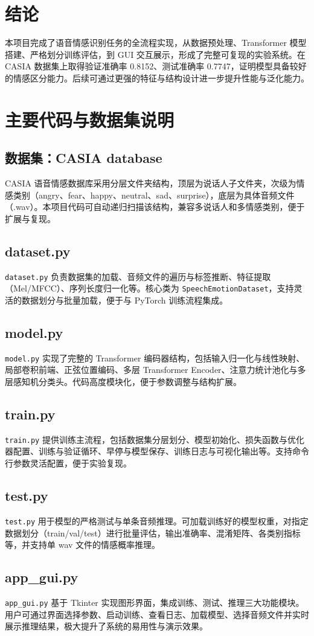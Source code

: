 \documentclass[UTF8, a4paper，12pt]{ctexart}
\begin{document}
\section{结论}
本项目完成了语音情感识别任务的全流程实现，从数据预处理、Transformer 模型搭建、严格划分训练评估，到 GUI 交互展示，形成了完整可复现的实验系统。在 CASIA 数据集上取得验证准确率 0.8152、测试准确率 0.7747，证明模型具备较好的情感区分能力。后续可通过更强的特征与结构设计进一步提升性能与泛化能力。


\section{主要代码与数据集说明}
\subsection{数据集：CASIA database}
CASIA 语音情感数据库采用分层文件夹结构，顶层为说话人子文件夹，次级为情感类别（angry、fear、happy、neutral、sad、surprise），底层为具体音频文件（.wav）。本项目代码可自动递归扫描该结构，兼容多说话人和多情感类别，便于扩展与复现。

\subsection{dataset.py}
\texttt{dataset.py} 负责数据集的加载、音频文件的遍历与标签推断、特征提取（Mel/MFCC）、序列长度归一化等。核心类为 \texttt{SpeechEmotionDataset}，支持灵活的数据划分与批量加载，便于与 PyTorch 训练流程集成。

\subsection{model.py}
\texttt{model.py} 实现了完整的 Transformer 编码器结构，包括输入归一化与线性映射、局部卷积前端、正弦位置编码、多层 Transformer Encoder、注意力统计池化与多层感知机分类头。代码高度模块化，便于参数调整与结构扩展。

\subsection{train.py}
\texttt{train.py} 提供训练主流程，包括数据集分层划分、模型初始化、损失函数与优化器配置、训练与验证循环、早停与模型保存、训练日志与可视化输出等。支持命令行参数灵活配置，便于实验复现。

\subsection{test.py}
\texttt{test.py} 用于模型的严格测试与单条音频推理。可加载训练好的模型权重，对指定数据划分（train/val/test）进行批量评估，输出准确率、混淆矩阵、各类别指标等，并支持单 wav 文件的情感概率推理。

\subsection{app\_gui.py}
\texttt{app\_gui.py} 基于 Tkinter 实现图形界面，集成训练、测试、推理三大功能模块。用户可通过界面选择参数、启动训练、查看日志、加载模型、选择音频文件并实时展示推理结果，极大提升了系统的易用性与演示效果。
\end{document}

